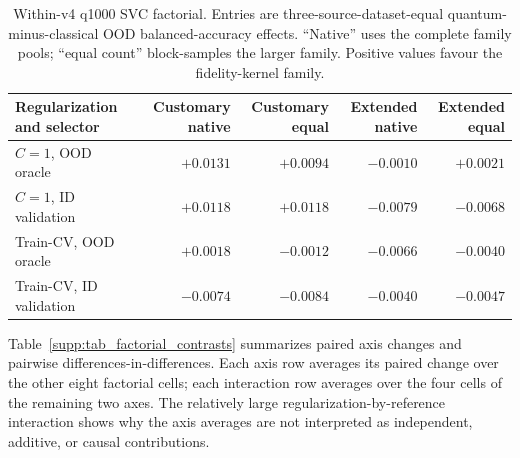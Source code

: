 \documentclass[11pt]{article}
\begin{document}
\begin{table}[htbp]
\centering
\caption{Within-v4 q1000 SVC factorial. Entries are three-source-dataset-equal
quantum-minus-classical OOD balanced-accuracy effects. ``Native'' uses the
complete family pools; ``equal count'' block-samples the larger family.
Positive values favour the fidelity-kernel family.}
\label{supp:tab_factorial}
\scriptsize
\setlength{\tabcolsep}{3.5pt}
\begin{tabular}{lrrrr}
\toprule
Regularization and selector & Customary native & Customary equal & Extended native & Extended equal \\
\midrule
$C=1$, OOD oracle & $+0.0131$ & $+0.0094$ & $-0.0010$ & $+0.0021$ \\
$C=1$, ID validation & $+0.0118$ & $+0.0118$ & $-0.0079$ & $-0.0068$ \\
Train-CV, OOD oracle & $+0.0018$ & $-0.0012$ & $-0.0066$ & $-0.0040$ \\
Train-CV, ID validation & $-0.0074$ & $-0.0084$ & $-0.0040$ & $-0.0047$ \\
\bottomrule
\end{tabular}
\end{table}

Table~\ref{supp:tab_factorial_contrasts} summarizes paired axis changes and
pairwise differences-in-differences. Each axis row averages its paired change
over the other eight factorial cells; each interaction row averages over the
four cells of the remaining two axes. The relatively large
regularization-by-reference interaction shows why the axis averages are not
interpreted as independent, additive, or causal contributions.
\end{document}
